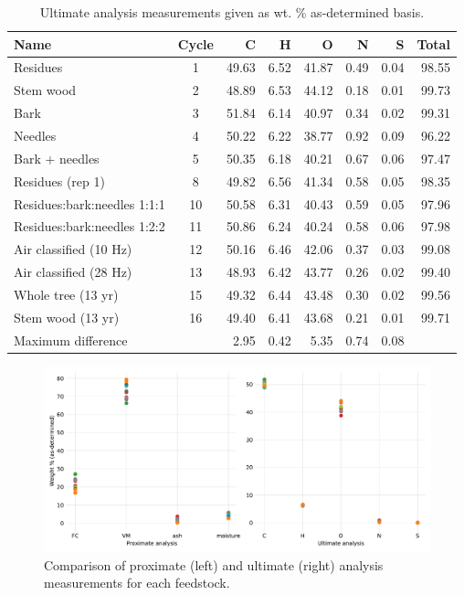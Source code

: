\documentclass[12pt,titlepage]{article}
\begin{document}
\begin{table}[H]
    \caption{Ultimate analysis measurements given as wt. \% as-determined basis.}
    \label{tab:ultimate}
    \centering
    \begin{tabular}{lcrrrrrr}
        \toprule
        Name & Cycle & C & H & O & N & S & Total \\
        \midrule
        Residues                    & 1  & 49.63 & 6.52 & 41.87 & 0.49 & 0.04 & 98.55 \\
        Stem wood                   & 2  & 48.89 & 6.53 & 44.12 & 0.18 & 0.01 & 99.73 \\
        Bark                        & 3  & 51.84 & 6.14 & 40.97 & 0.34 & 0.02 & 99.31 \\
        Needles                     & 4  & 50.22 & 6.22 & 38.77 & 0.92 & 0.09 & 96.22 \\
        Bark + needles              & 5  & 50.35 & 6.18 & 40.21 & 0.67 & 0.06 & 97.47 \\
        Residues (rep 1)            & 8  & 49.82 & 6.56 & 41.34 & 0.58 & 0.05 & 98.35 \\
        Residues:bark:needles 1:1:1 & 10 & 50.58 & 6.31 & 40.43 & 0.59 & 0.05 & 97.96 \\
        Residues:bark:needles 1:2:2 & 11 & 50.86 & 6.24 & 40.24 & 0.58 & 0.06 & 97.98 \\
        Air classified (10 Hz)      & 12 & 50.16 & 6.46 & 42.06 & 0.37 & 0.03 & 99.08 \\
        Air classified (28 Hz)      & 13 & 48.93 & 6.42 & 43.77 & 0.26 & 0.02 & 99.40 \\
        Whole tree (13 yr)          & 15 & 49.32 & 6.44 & 43.48 & 0.30 & 0.02 & 99.56 \\
        Stem wood (13 yr)           & 16 & 49.40 & 6.41 & 43.68 & 0.21 & 0.01 & 99.71 \\
        \cmidrule{3-7}
        \multicolumn{2}{l}{Maximum difference} & 2.95 & 0.42 & 5.35 & 0.74 & 0.08 & \\
        \bottomrule
    \end{tabular}
\end{table}

\begin{figure}[H]
    \centering
    \includegraphics[width=\textwidth]{figures/prox-ult-analysis.pdf}
    \caption{Comparison of proximate (left) and ultimate (right) analysis measurements for each feedstock.}
    \label{fig:prox-ult-analysis}
\end{figure}
\end{document}
